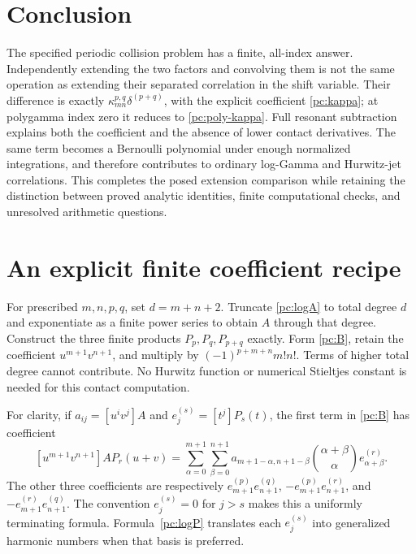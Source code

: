 \documentclass[11pt,a4paper]{article}
\numberwithin{equation}{section}
\theoremstyle{definition}
\begin{document}
\section*{Conclusion}
The specified periodic collision problem has a finite, all-index answer. Independently extending the two factors and convolving them is not the same operation as extending their separated correlation in the shift variable. Their difference is exactly $\kappa_{mn}^{p,q}\delta^{(p+q)}$, with the explicit coefficient \eqref{pc:kappa}; at polygamma index zero it reduces to \eqref{pc:poly-kappa}. Full resonant subtraction explains both the coefficient and the absence of lower contact derivatives. The same term becomes a Bernoulli polynomial under enough normalized integrations, and therefore contributes to ordinary log-Gamma and Hurwitz-jet correlations. This completes the posed extension comparison while retaining the distinction between proved analytic identities, finite computational checks, and unresolved arithmetic questions.

\appendix
\section{An explicit finite coefficient recipe}\label{pc:recipe}
For prescribed $m,n,p,q$, set $d=m+n+2$. Truncate \eqref{pc:logA} to total degree $d$ and exponentiate as a finite power series to obtain $A$ through that degree. Construct the three finite products $P_p,P_q,P_{p+q}$ exactly. Form \eqref{pc:B}, retain the coefficient $u^{m+1}v^{n+1}$, and multiply by $(-1)^{p+m+n}m!n!$. Terms of higher total degree cannot contribute. No Hurwitz function or numerical Stieltjes constant is needed for this contact computation.

For clarity, if $a_{ij}=[u^iv^j]A$ and $e_j^{(s)}=[t^j]P_s(t)$, the first term in \eqref{pc:B} has coefficient
\begin{equation}\label{pc:finite-sum}
[u^{m+1}v^{n+1}]A P_r(u+v)
=\sum_{\alpha=0}^{m+1}\sum_{\beta=0}^{n+1}
a_{m+1-\alpha,n+1-\beta}
\binom{\alpha+\beta}{\alpha}e_{\alpha+\beta}^{(r)}.
\end{equation}
The other three coefficients are respectively
$e_{m+1}^{(p)}e_{n+1}^{(q)}$,
$-e_{m+1}^{(p)}e_{n+1}^{(r)}$,
and $-e_{m+1}^{(r)}e_{n+1}^{(q)}$.
The convention $e_j^{(s)}=0$ for $j>s$ makes this a uniformly terminating formula. Formula~\eqref{pc:logP} translates each $e_j^{(s)}$ into generalized harmonic numbers when that basis is preferred.
\end{document}
